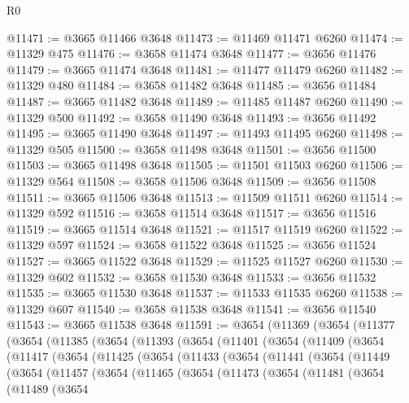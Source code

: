 \begin{lexlean}{R0}
\begin{coremodule}
@11471 := @3665 @11466 @3648
@11473 := @11469 @11471 @6260
@11474 := @11329 @475
@11476 := @3658 @11474 @3648
@11477 := @3656 @11476
@11479 := @3665 @11474 @3648
@11481 := @11477 @11479 @6260
@11482 := @11329 @480
@11484 := @3658 @11482 @3648
@11485 := @3656 @11484
@11487 := @3665 @11482 @3648
@11489 := @11485 @11487 @6260
@11490 := @11329 @500
@11492 := @3658 @11490 @3648
@11493 := @3656 @11492
@11495 := @3665 @11490 @3648
@11497 := @11493 @11495 @6260
@11498 := @11329 @505
@11500 := @3658 @11498 @3648
@11501 := @3656 @11500
@11503 := @3665 @11498 @3648
@11505 := @11501 @11503 @6260
@11506 := @11329 @564
@11508 := @3658 @11506 @3648
@11509 := @3656 @11508
@11511 := @3665 @11506 @3648
@11513 := @11509 @11511 @6260
@11514 := @11329 @592
@11516 := @3658 @11514 @3648
@11517 := @3656 @11516
@11519 := @3665 @11514 @3648
@11521 := @11517 @11519 @6260
@11522 := @11329 @597
@11524 := @3658 @11522 @3648
@11525 := @3656 @11524
@11527 := @3665 @11522 @3648
@11529 := @11525 @11527 @6260
@11530 := @11329 @602
@11532 := @3658 @11530 @3648
@11533 := @3656 @11532
@11535 := @3665 @11530 @3648
@11537 := @11533 @11535 @6260
@11538 := @11329 @607
@11540 := @3658 @11538 @3648
@11541 := @3656 @11540
@11543 := @3665 @11538 @3648
@11591 := @3654
    (@11369
      (@3654
        (@11377
          (@3654
            (@11385
              (@3654
                (@11393
                  (@3654
                    (@11401
                      (@3654
                        (@11409
                          (@3654
                            (@11417
                              (@3654
                                (@11425
                                  (@3654
                                    (@11433
                                      (@3654
                                        (@11441
                                          (@3654
                                            (@11449
                                              (@3654
                                                (@11457
                                                  (@3654
                                                    (@11465
                                                      (@3654
                                                        (@11473
                                                          (@3654
                                                            (@11481
                                                              (@3654
                                                                (@11489
                                                                  (@3654

\end{coremodule}
\end{lexlean}
